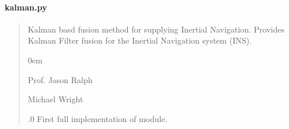\documentclass[letterpaper,10pt,english]{sphinxmanual}
\begin{document}
\paragraph{kalman.py}
\label{\detokenize{modules/fusion/kalman:kalman-py}}\begin{quote}\begin{description}
\sphinxAtStartPar
Kalman basd fusion method for supplying Inertial Navigation.
Provides Kalman Filter fusion for the Inertial Navigation system (INS).

\begin{DUlineblock}{0em}
\item[] Prof. Jason Ralph \sphinxhyphen{} 
\item[] Michael Wright \sphinxhyphen{} 
\end{DUlineblock}

.0 \sphinxhyphen{} First full implementation of module.

\end{description}\end{quote}
\end{document}
